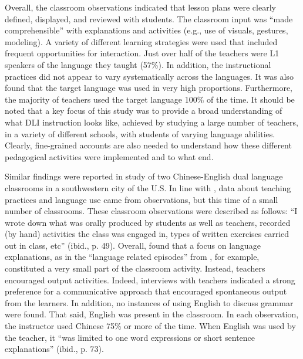 \documentclass[output=paper,chinesefont]{langscibook}
\begin{document}
Overall, the classroom observations indicated that lesson plans were clearly defined, displayed, and reviewed with students. The classroom input was ``made comprehensible'' with explanations and activities (e.g., use of visuals, gestures, modeling). A variety of different learning strategies were used that included frequent opportunities for interaction. Just over half of the teachers were L1 speakers of the language they taught (57\%). In addition, the instructional practices did not appear to vary systematically across the languages. It was also found that the target language was used in very high proportions. Furthermore, the majority of teachers used the target language 100\% of the time. It should be noted that a key focus of this study was to provide a broad understanding of what DLI instruction looks like, achieved by studying a large number of teachers, in a variety of different schools, with students of varying language abilities. Clearly, fine-grained accounts are also needed to understand how these different pedagogical activities were implemented and to what end. 

Similar findings were reported in  study of two Chinese-English dual language classrooms in a southwestern city of the U.S. In line with \citet{LiEtAl2016}, data about teaching practices and language use came from observations, but this time of a small number of classrooms. These classroom observations were described as follows: ``I wrote down what was orally produced by students as well as teachers, recorded (by hand) activities the class was engaged in, types of written exercises carried out in class, etc'' (ibid., p. 49). Overall, \citet{Jia2017} found that a focus on language explanations, as in the ``language related episodes'' from \citet{CollinsEtAl2012}, for example, constituted a very small part of the classroom activity. Instead, teachers encouraged output activities. Indeed, interviews with teachers indicated a strong preference for a communicative approach that encouraged spontaneous output from the learners. In addition, no instances of using English to discuss grammar were found. That said, English was present in the classroom. In each observation, the instructor used Chinese 75\% or more of the time. When English was used by the teacher, it ``was limited to one word expressions or short sentence explanations'' (ibid., p. 73).
\end{document}
